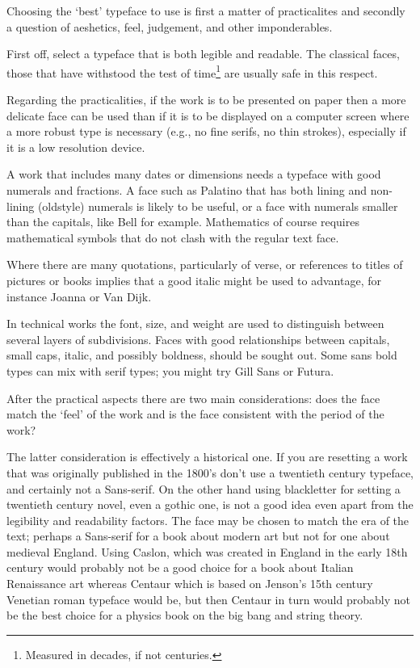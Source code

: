 \documentclass[10pt,a4paper,extrafontsizes]{memoir}
\begin{document}
\begin{paracol}{2}
\switchEng
    Choosing the `best' typeface to use is first a matter of practicalites
and secondly a question of aeshetics, feel, judgement, and other 
imponderables.

    First off, 
select a typeface that is both legible and readable.
The classical faces, those that have withstood the test of 
time\footnote{Measured in decades, if not centuries.} are
usually safe in this respect.

   Regarding the practicalities, 
if the work is to be presented on paper then
a more delicate face can be used than if it is to be displayed on a computer
screen where a more robust type is necessary (e.g., no fine serifs, no 
thin strokes), especially if it is a low resolution device.

  A work that includes many dates or dimensions needs a typeface with good
numerals and fractions. A face such as Palatino
 that has both lining and non-lining (oldstyle)
numerals is likely to be useful, or a face with numerals smaller than the
capitals, like Bell for example. Mathematics of course requires mathematical
symbols that do not clash with the regular text face.

    Where there are many quotations, particularly of verse, or references 
to titles of pictures or books implies that a good italic might be used
to advantage, for instance Joanna or 
Van Dijk.

    In technical works the font, size, and weight are used to distinguish 
between several layers of subdivisions. Faces with good relationships between
capitals, small caps, italic, and possibly boldness, should be sought out.  
Some sans bold types can mix with serif types; you might try 
Gill Sans or Futura.



    After the practical aspects there are two main considerations: 
does the face match the `feel' of the work and is the face consistent 
with the period of the 
work? 

    The latter consideration is effectively a historical one. If you are
resetting a work that was originally published in the 1800's don't
use a twentieth century typeface, and certainly not a Sans-serif. On the
other hand using blackletter for setting a twentieth century novel, 
even a gothic one, is not a good idea even apart from the legibility and
readability factors.
    The face may be chosen to match the era of the text; perhaps a Sans-serif
for a book about modern art but not for one about medieval England. Using 
Caslon, which was created in England in the early 
18th century would 
probably not be a good choice for a book about Italian Renaissance art 
whereas Centaur which is based on Jenson's 
15th century Venetian roman
typeface would be, but then Centaur in turn would probably not be the
best choice for a physics book on the big bang and string theory. 


\end{paracol}
\end{document}
